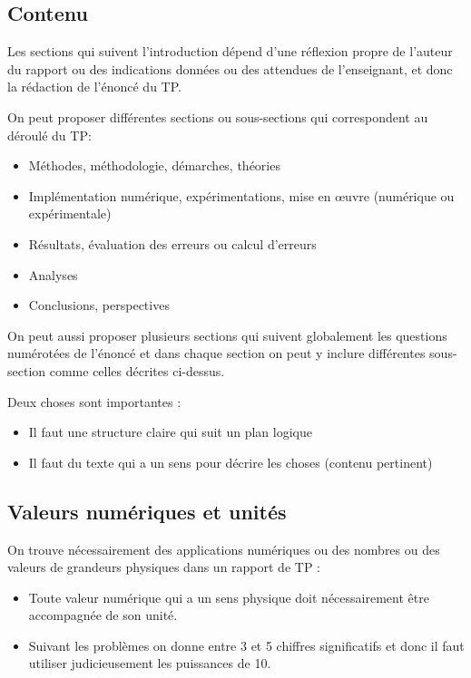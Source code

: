 \subsection{Contenu}

Les sections qui suivent l'introduction dépend d'une réflexion propre de l'auteur du rapport ou des indications données ou des attendues de l'enseignant,
et donc la rédaction de l'énoncé du TP.

On peut proposer différentes sections ou sous-sections qui correspondent au déroulé du TP:
\begin{itemize}
\item Méthodes, méthodologie, démarches, théories
\item Implémentation numérique, expérimentations, mise en {\oe}uvre (numérique ou expérimentale)
\item Résultats, évaluation des erreurs ou calcul d'erreurs
\item Analyses
\item Conclusions, perspectives
\end{itemize}


On peut aussi proposer plusieurs sections qui suivent globalement les questions numérotées de l'énoncé et dans chaque section on peut y inclure 
 différentes sous-section comme celles décrites ci-dessus.

Deux choses sont importantes :
\begin{itemize}
\item Il faut une structure claire qui suit un plan logique
\item Il faut du texte qui a un sens pour décrire les choses (contenu pertinent)
\end{itemize}
     
      
\subsection{Valeurs numériques et unités}

On trouve nécessairement des applications numériques ou des nombres ou des valeurs de grandeurs physiques dans un rapport de TP :

\begin{itemize}
\item Toute valeur numérique qui a un sens physique doit  nécessairement être
 accompagnée de son unité.
\item Suivant les problèmes on donne entre 3 et 5 chiffres significatifs et donc il faut utiliser judicieusement les puissances de 10.
\end{itemize} 
     

